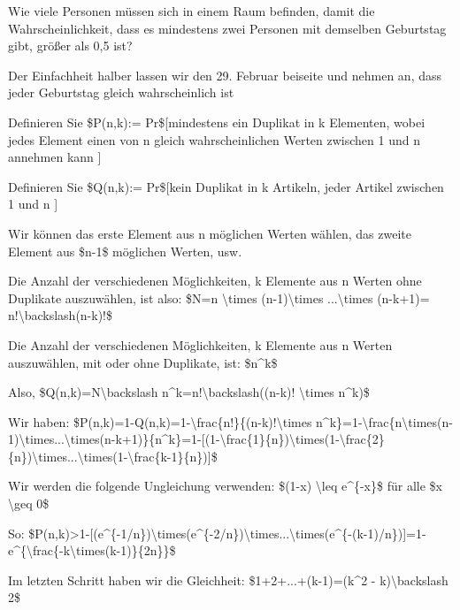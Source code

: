 \documentclass[a4paper]{article}
\begin{document}
\begin{multicols}{3}
\begin{itemize*}
            \begin{itemize*}
                  \item Wie viele Personen müssen sich in einem Raum befinden, damit die Wahrscheinlichkeit, dass es mindestens zwei Personen mit demselben Geburtstag gibt, größer als 0,5 ist?
                  \item Der Einfachheit halber lassen wir den 29. Februar beiseite und nehmen an, dass jeder Geburtstag gleich wahrscheinlich ist
            \end{itemize*}
            \item
            Definieren Sie \$P(n,k):= Pr\${[}mindestens ein Duplikat in k
            Elementen, wobei jedes Element einen von n gleich wahrscheinlichen
            Werten zwischen 1 und n annehmen kann {]}
            \item
            Definieren Sie \$Q(n,k):= Pr\${[}kein Duplikat in k Artikeln, jeder
            Artikel zwischen 1 und n {]}

            \begin{itemize*}
                  \item Wir können das erste Element aus n möglichen Werten wählen, das zweite Element aus \$n-1\$ möglichen Werten, usw.
                  \item Die Anzahl der verschiedenen Möglichkeiten, k Elemente aus n Werten ohne Duplikate auszuwählen, ist also: \$N=n \textbackslash times (n-1)\textbackslash times ...\textbackslash times (n-k+1)= n!\textbackslash backslash(n-k)!\$
                  \item Die Anzahl der verschiedenen Möglichkeiten, k Elemente aus n Werten auszuwählen, mit oder ohne Duplikate, ist: \$n\^{}k\$
                  \item Also, \$Q(n,k)=N\textbackslash backslash n\^{}k=n!\textbackslash backslash((n-k)! \textbackslash times n\^{}k)\$
            \end{itemize*}
            \item
            Wir haben:
            \$P(n,k)=1-Q(n,k)=1-\textbackslash frac\{n!\}\{(n-k)!\textbackslash times
            n\^{}k\}=1-\textbackslash frac\{n\textbackslash times(n-1)\textbackslash times...\textbackslash times(n-k+1)\}\{n\^{}k\}=1-{[}(1-\textbackslash frac\{1\}\{n\})\textbackslash times(1-\textbackslash frac\{2\}\{n\})\textbackslash times...\textbackslash times(1-\textbackslash frac\{k-1\}\{n\}){]}\$
            \item
            Wir werden die folgende Ungleichung verwenden: \$(1-x)
            \textbackslash leq e\^{}\{-x\}\$ für alle \$x \textbackslash geq 0\$
            \item
            So:
            \$P(n,k)\textgreater1-{[}(e\^{}\{-1/n\})\textbackslash times(e\^{}\{-2/n\})\textbackslash times...\textbackslash times(e\^{}\{-(k-1)/n\}){]}=1-e\^{}\{\textbackslash frac\{-k\textbackslash times(k-1)\}\{2n\}\}\$
            \item
            Im letzten Schritt haben wir die Gleichheit: \$1+2+...+(k-1)=(k\^{}2 -
            k)\textbackslash backslash 2\$


\end{itemize*}
\end{multicols}
\end{document}
